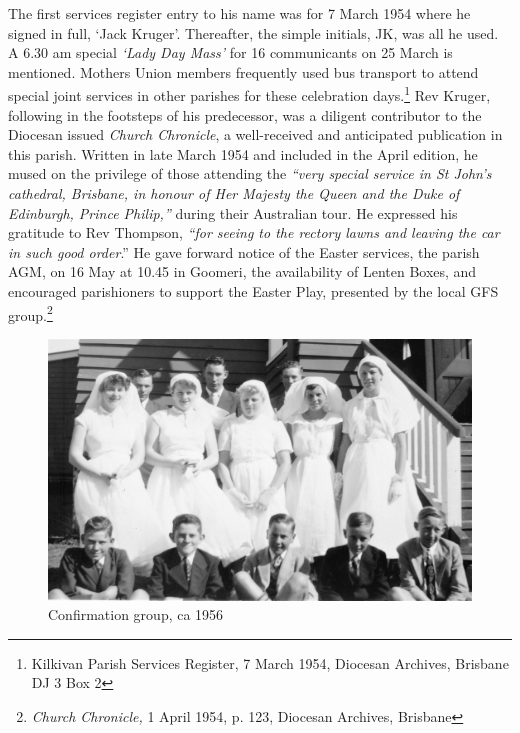 The first services register entry to his name was for 7 March 1954 where he signed in full, `Jack Kruger'. Thereafter, the simple initials, JK, was all he used. A 6.30 am special \emph{`Lady Day Mass'} for 16 communicants on 25 March is mentioned. Mothers Union members frequently used bus transport to attend special joint services in other parishes for these celebration days.\footnote{Kilkivan Parish Services Register, 7 March 1954, Diocesan Archives, Brisbane DJ 3 Box 2} Rev Kruger, following in the footsteps of his predecessor, was a diligent contributor to the Diocesan issued \emph{Church Chronicle}, a well-received and anticipated publication in this parish. Written in late March 1954 and included in the April edition, he mused on the privilege of those attending the \emph{``very special service in St John's cathedral, Brisbane, in honour of Her Majesty the Queen and the Duke of Edinburgh, Prince Philip,''} during their Australian tour. He expressed his gratitude to Rev Thompson, \emph{``for seeing to the rectory lawns and leaving the car in such good order}.'' He gave forward notice of the Easter services, the parish AGM, on 16 May at 10.45 in Goomeri, the availability of Lenten Boxes, and encouraged parishioners to support the Easter Play, presented by the local GFS group.\footnote{\emph{Church Chronicle,} 1 April 1954, p. 123, Diocesan Archives, Brisbane}








\begin{figure}[!htb]
\begin{center}
\includegraphics[width=1.\textwidth,center]{../images/confirmation1956.jpg}
\caption{Confirmation group, ca 1956}
\end{center}
\end{figure}





